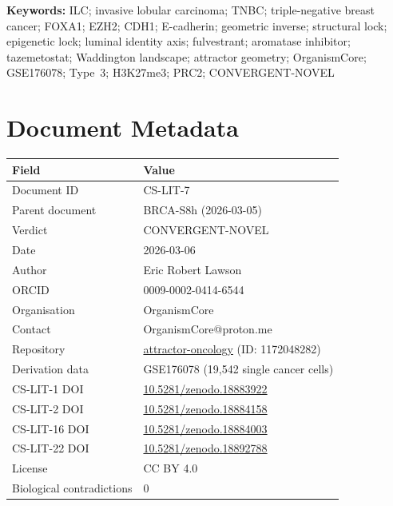 \documentclass[12pt, a4paper]{article}
\begin{document}
\vspace{0.5em}
\noindent\textbf{Keywords:}
ILC; invasive lobular carcinoma; TNBC;
triple-negative breast cancer; FOXA1; EZH2;
CDH1; E-cadherin; geometric inverse; structural lock;
epigenetic lock; luminal identity axis; fulvestrant;
aromatase inhibitor; tazemetostat; Waddington landscape;
attractor geometry; OrganismCore; GSE176078; Type~3;
H3K27me3; PRC2; CONVERGENT-NOVEL

\newpage
\tableofcontents
\newpage

\section{Document Metadata}

\begin{center}
\begin{tabular}{ll}
\toprule
\textbf{Field} & \textbf{Value} \\
\midrule
Document ID & CS-LIT-7 \\
Parent document & BRCA-S8h (2026-03-05) \\
Verdict & CONVERGENT-NOVEL \\
Date & 2026-03-06 \\
Author & Eric Robert Lawson \\
ORCID & 0009-0002-0414-6544 \\
Organisation & OrganismCore \\
Contact & OrganismCore@proton.me \\
Repository &
\href{https://github.com/Eric-Robert-Lawson/attractor-oncology}
{attractor-oncology} (ID: 1172048282) \\
Derivation data & GSE176078 (19,542 single cancer cells) \\
CS-LIT-1 DOI &
\href{https://doi.org/10.5281/zenodo.18883922}
{10.5281/zenodo.18883922} \\
CS-LIT-2 DOI &
\href{https://doi.org/10.5281/zenodo.18884158}
{10.5281/zenodo.18884158} \\
CS-LIT-16 DOI &
\href{https://doi.org/10.5281/zenodo.18884003}
{10.5281/zenodo.18884003} \\
CS-LIT-22 DOI &
\href{https://doi.org/10.5281/zenodo.18892788}
{10.5281/zenodo.18892788} \\
License & CC BY 4.0 \\
Biological contradictions & 0 \\
\bottomrule
\end{tabular}
\end{center}
\end{document}
